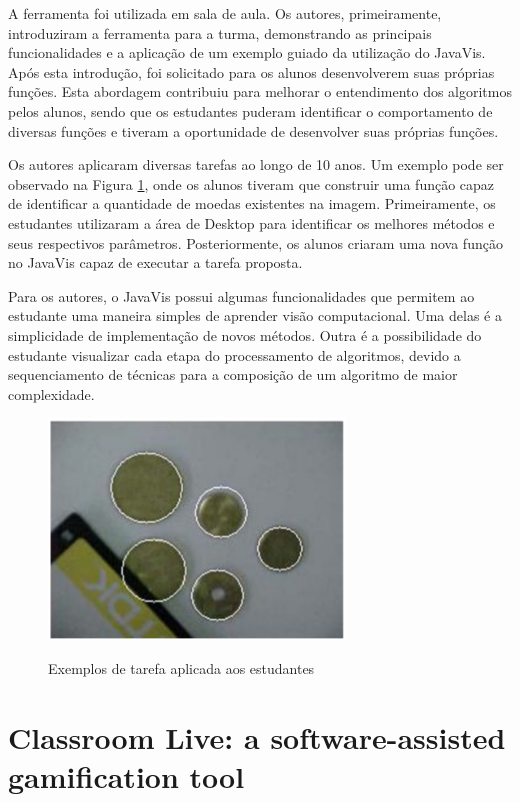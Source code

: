 \documentclass[
	12pt,				%
	oneside,			%
	a4paper,			%
	english,			%
	french,				%
	spanish,			%
	brazil,				%
	]{abntex2}
\begin{document}
A ferramenta foi utilizada em sala de aula. Os autores, primeiramente, introduziram a ferramenta para a turma, demonstrando as principais funcionalidades e a aplicação de um exemplo guiado da utilização do JavaVis. Após esta introdução, foi solicitado para os alunos desenvolverem suas próprias funções. Esta abordagem contribuiu para melhorar o entendimento dos algoritmos pelos alunos, sendo que os estudantes puderam identificar o comportamento de diversas funções e tiveram a oportunidade de desenvolver suas próprias funções.

Os autores aplicaram diversas tarefas ao longo de 10 anos. Um exemplo pode ser observado na Figura \ref{fig:javavis_avaliacao}, onde os alunos tiveram que construir uma função capaz de identificar a quantidade de moedas existentes na imagem. Primeiramente, os estudantes utilizaram a área de Desktop para identificar os melhores métodos e seus respectivos parâmetros. Posteriormente, os alunos criaram uma nova função no JavaVis capaz de executar a tarefa proposta.

Para os autores, o JavaVis possui algumas funcionalidades que permitem ao estudante uma maneira simples de aprender visão computacional. Uma delas é a simplicidade de implementação de novos métodos. Outra é a possibilidade do estudante visualizar cada etapa do processamento de algoritmos, devido a sequenciamento de técnicas para a composição de um algoritmo de maior complexidade.

\begin{figure}[ht]
\centering
\caption{Exemplos de tarefa aplicada aos estudantes}
\includegraphics[width=0.7\textwidth]{imagens/javavis_avaliacao.png}
\label{fig:javavis_avaliacao}
\end{figure}

\section{Classroom Live: a software-assisted gamification tool}
\label{sec:classrom}
\end{document}

